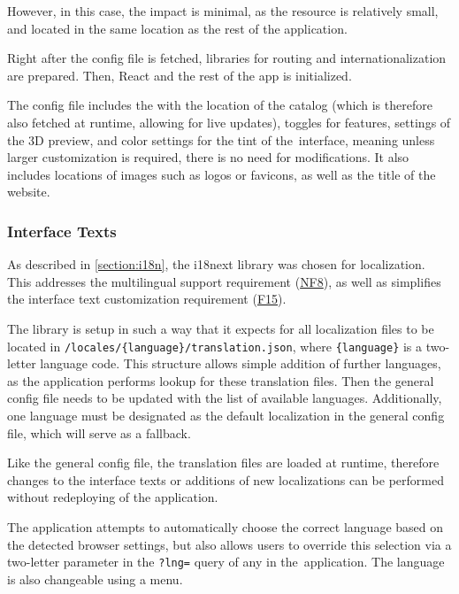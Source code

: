 However, in this case, the impact is minimal, as the resource is relatively small, and located in the same location as the rest of the application.

Right after the config file is fetched, libraries for routing and internationalization are prepared. Then, React and the rest of the app is initialized. 

The config file includes the  with the location of the catalog (which is therefore also fetched at runtime, allowing for live updates), toggles for features, settings of the 3D preview, and color settings for the tint of the~interface, meaning unless larger customization is required, there is no need for  modifications. It also includes locations of images such as logos or favicons, as well as the title of the website.


\subsubsection{Interface Texts} \label{section:impl-languages}

As described in \autoref{section:i18n}, the i18next library was chosen for localization. This addresses the multilingual support requirement (\hyperref[itm:NF8]{NF8}), as well as simplifies the interface text customization requirement (\hyperref[itm:F15]{F15}).

The library is setup in such a way that it expects for all localization files to be located in \texttt{/locales/\{language\}/translation.json}, where \texttt{\{language\}} is a two-letter language code. This structure allows simple addition of further languages, as the application performs lookup for these translation files. Then the general config file needs to be updated with the list of available languages. Additionally, one language must be designated as the default localization in the general config file, which will serve as a fallback.

Like the general config file, the translation files are loaded at runtime, therefore changes to the interface texts or additions of new localizations can be performed without redeploying of the application.

The application attempts to automatically choose the correct language based on the detected browser settings, but also allows users to override this selection via a two-letter parameter in the \texttt{?lng=} query of any  in the~application. The language is also changeable using a menu.

